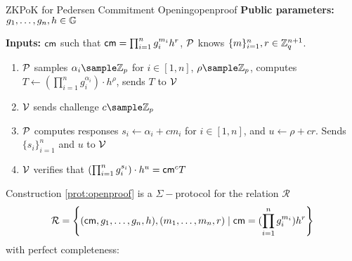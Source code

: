 \newpage

\begin{protocol}{ZKPoK for Pedersen Commitment Opening}{openproof}
    \vspace{1em}
    \textbf{Public parameters:}  $g_1, \dots, g_n, h \in \mathbb{G}$

    \textbf{Inputs:} $\mathsf{cm}$ such that $\mathsf{cm} = \prod_{i=1}^ng_i^{m_i}h^r$, \;    $\mathcal{P}$ knows $\{m\}_{i=1}^n, r \in \mathbb{Z}_q^{n+1}$.

    \vspace{1em}

    \begin{enumerate}
        \item $\mathcal{P}$ samples $\alpha_i \sample \Z_p$ for $i \in [1,n]$, $\rho \sample \Z_p$, computes $T \gets (\prod_{i=1}^ng_i^{\alpha_i})\cdot h^{\rho}$, sends $T$ to $\mathcal{V}$
        
        \item $\mathcal{V}$ sends challenge $c \sample \Z_p$
    
        \item $\mathcal{P}$ computes responses $s_i \gets \alpha_i + cm_i$ for $i \in [1,n]$, and $u \gets \rho + cr$. Sends $\{s_i\}_{i=1}^n$ and $u$ to $\mathcal{V}$
    
        \item $\mathcal{V}$ verifies that $ (\prod_{i=1}^ng_i^{s_i})\cdot h^u = \mathsf{cm}^cT$
    \end{enumerate}
\end{protocol}

\begin{theorem}
    Construction \ref{prot:openproof} is a $\Sigma-$protocol for the relation $\mathcal{R}$
    \[
        \mathcal{R} = \left\{ (\mathsf{cm},g_1,\dots,g_n,h),(m_1,\dots,m_n,r) \; | \; \mathsf{cm} = (\prod_{i=1}^ng_i^{m_i})h^r \right\}
    \]
    with perfect completeness: 
\end{theorem}


